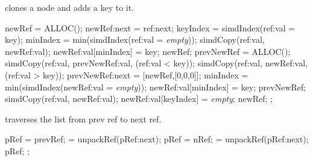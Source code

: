 \documentclass[11pt,onecolumn]{IEEEtran}
\begin{document}
\begin{algorithm}
  \caption{clones a node and adds a key to it.}
  \label{alg:clone}
  \begin{algorithmic}[1]
    \Statex   
      \State newRef = ALLOC();
      \State newRef:next = ref:next;
      \State keyIndex = simdIndex(ref:val = key);
        \State minIndex    = min(simdIndex(ref:val = {\it empty}));
          \State simdCopy(ref:val, newRef:val);
          \State newRef:val[minIndex] = key;
          \State
          \Return newRef;
        \Else
          \State prevNewRef = ALLOC();
          \State simdCopy(ref:val, prevNewRef:val, (ref:val < key));
          \State simdCopy(ref:val, newRef:val, (ref:val > key));
          \State prevNewRef:next = [newRef,[0,0,0]];
          \State minIndex    = min(simdIndex(newRef:val = {\it empty}));      
          \State newRef:val[minIndex] = key;
          \State
          \Return prevNewRef;
        \EndIf
      \Else
        \State simdCopy(ref:val, newRef:val);
        \State newRef:val[keyIndex] = {\it empty};
        \State
        \Return newRef;
      \EndIf  
      \State
      ;
    \EndFunction
  \end{algorithmic}
\end{algorithm}

\begin{algorithm}
  \caption{traverses the list from prev ref to next ref.}
  \label{alg:traverse}
  \begin{algorithmic}[1]
    \Statex   
      \State pRef = prevRef;
       = unpackRef(pRef:next);
          \State pRef = nRef;
           = unpackRef(pRef:next);
        \Else
          \State
          \Return pRef;
        \EndIf
      \EndWhile
      \State
      ;
    \EndFunction
  \end{algorithmic}
\end{algorithm}
\end{document}
